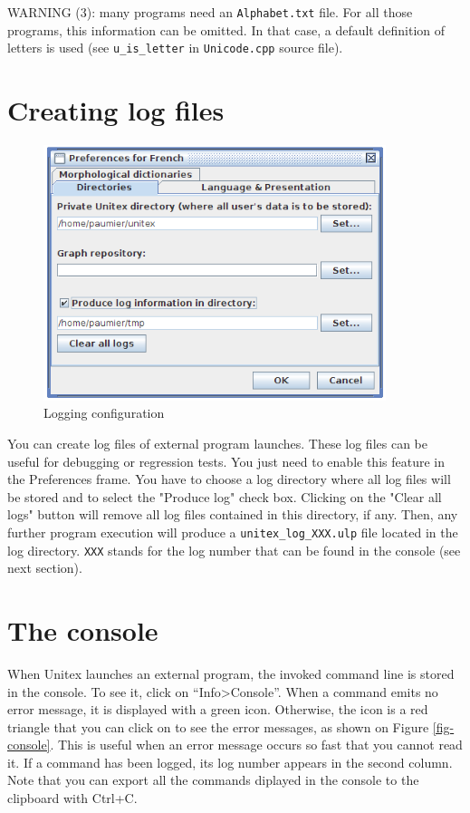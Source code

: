 \bigskip
\noindent WARNING (3): many programs need an \verb+Alphabet.txt+ file. For all
those programs, this information can be omitted. In that case, a default
definition of letters is used (see \verb+u_is_letter+ 
in \verb$Unicode.cpp$ source file).


\section{Creating log files}
\label{section-creating-log-files}

\bigskip
\begin{figure}[!h]
\begin{center}
\includegraphics[width=10cm]{resources/img/fig11-1a.png}
\caption{Logging configuration\label{fig-logging-config}}
\end{center}
\end{figure}

You can create log files of external program launches. These log files can be useful for debugging
or regression tests. You just need to enable this feature in the Preferences frame. You have
to choose a log directory where all log files will be stored and to select the "Produce log"
check box. Clicking on the "Clear all logs" button will remove all log files contained in this directory,
if any. Then, any further program execution will produce a \verb+unitex_log_XXX.ulp+ file located in the log 
directory. \verb+XXX+ stands for the log number that can be found in the console (see next section).



\section{The console}
\label{section-console}
When Unitex launches an external program, the invoked command line is stored in
the console. To see it, click on ``Info>Console''. When a command emits
no error message, it is displayed with a green icon. Otherwise, the icon is a red
triangle that you can click on to see the error messages, as shown on Figure
\ref{fig-console}. This is useful when an error message occurs so fast that you
cannot read it. If a command has been logged, its log number appears in the second column.
Note that you can export all the commands diplayed in the
console to the clipboard with Ctrl+C.

